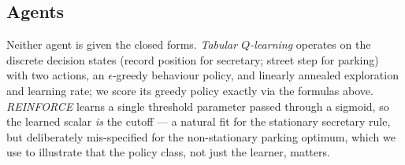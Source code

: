 \subsection{Agents}
Neither agent is given the closed forms. \emph{Tabular $Q$-learning} operates on
the discrete decision states (record position for secretary; street step for
parking) with two actions, an $\epsilon$-greedy behaviour policy, and linearly
annealed exploration and learning rate; we score its greedy policy exactly via
the formulas above. \emph{REINFORCE} learns a single threshold parameter passed
through a sigmoid, so the learned scalar \emph{is} the cutoff --- a natural fit
for the stationary secretary rule, but deliberately mis-specified for the
non-stationary parking optimum, which we use to illustrate that the policy
class, not just the learner, matters.
